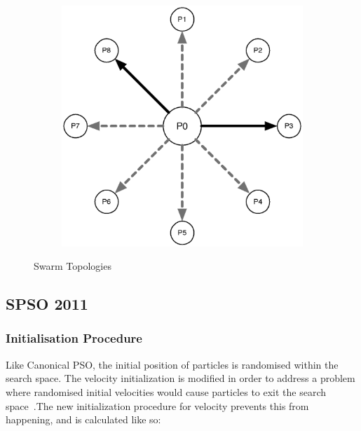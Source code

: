 \documentclass{csfourzero}
\begin{document}
\begin{figure}
\begin{subfigure}[b]{0.3\textwidth}
    \label{fig:ring_topology}
  \end{subfigure}
  ~
  \begin{subfigure}[b]{0.3\textwidth}
    \includegraphics[width=\textwidth]{star_topology.eps}
    \label{fig:adaptive_random_topology}
  \end{subfigure}
  \caption{Swarm Topologies}
  \label{fig:swarm_topology}
\end{figure}

\subsection{SPSO 2011}

\subsubsection{Initialisation Procedure}

Like Canonical PSO, the initial position of particles is randomised within the
search space. The velocity initialization is modified in order to address a
problem where randomised initial velocities would cause particles to exit the
search space~\cite{Helwig:2008bl}.The new initialization procedure for velocity
prevents this from happening, and is calculated like so:
\end{document}

